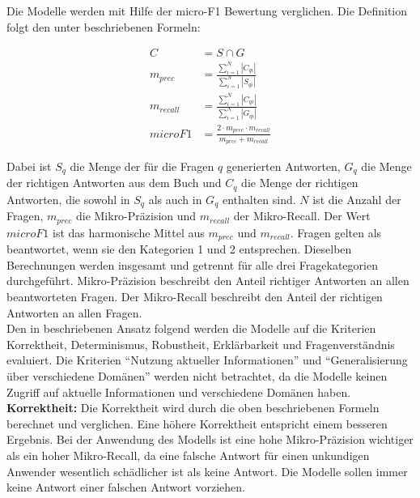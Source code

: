 Die Modelle werden mit Hilfe der micro-F1 Bewertung verglichen.
Die Definition folgt den unter \citet{chatgpt_qas} beschriebenen Formeln:
\begin{ceqn} %
\begin{align}
    C &= S \cap G \\
    m_{prec} &= \frac{\sum_{i=1}^{N}|C_{qi}|}{\sum_{i=1}^{N}|S_{qi}|} \\
    m_{recall} &= \frac{\sum_{i=1}^{N}|C_{qi}|}{\sum_{i=1}^{N}|G_{qi}|} \\
    microF1 &= \frac{2 \cdot m_{prec} \cdot m_{recall}}{m_{prec} + m_{recall}}
\end{align}
\end{ceqn}
Dabei ist $S_q$ die Menge der für die Fragen $q$ generierten Antworten, $G_q$ die Menge der richtigen Antworten aus dem Buch \citet{bb} und $C_q$ die Menge der richtigen Antworten, die sowohl in $S_q$ als auch in $G_q$ enthalten sind.
$N$ ist die Anzahl der Fragen, $m_{prec}$ die Mikro-Präzision und $m_{recall}$ der Mikro-Recall.
Der Wert $microF1$ ist das harmonische Mittel aus $m_{prec}$ und $m_{recall}$.
Fragen gelten als beantwortet, wenn sie den Kategorien 1 und 2 entsprechen.
Dieselben Berechnungen werden insgesamt und getrennt für alle drei Fragekategorien durchgeführt.
Mikro-Präzision beschreibt den Anteil richtiger Antworten an allen beantworteten Fragen.
Der Mikro-Recall beschreibt den Anteil der richtigen Antworten an allen Fragen.\\

Den in \citet{chatgpt_qas} beschriebenen Ansatz folgend werden die Modelle auf die Kriterien Korrektheit, Determinismus, Robustheit, Erklärbarkeit und Fragenverständnis evaluiert.
Die Kriterien \enquote{Nutzung aktueller Informationen} und \enquote{Generalisierung über verschiedene Domänen} werden nicht betrachtet, da die Modelle keinen Zugriff auf aktuelle Informationen und verschiedene Domänen haben.\\

\noindent\textbf{Korrektheit:}\newline
Die Korrektheit wird durch die oben beschriebenen Formeln berechnet und verglichen.
Eine höhere Korrektheit entspricht einem besseren Ergebnis.
Bei der Anwendung des Modells ist eine hohe Mikro-Präzision wichtiger als ein hoher Mikro-Recall, da eine falsche Antwort für einen unkundigen Anwender wesentlich schädlicher ist als keine Antwort.
Die Modelle sollen immer keine Antwort einer falschen Antwort vorziehen.\\

